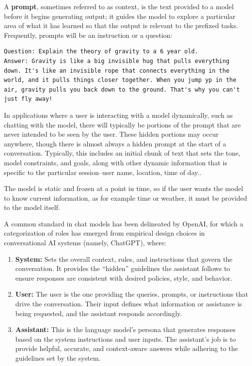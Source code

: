 A \textbf{prompt}, sometimes referred to as context, is the text provided to a model before it begins generating output; it guides the model to explore a particular area of what it has learned so that the output is relevant to the prefixed tasks. Frequently, prompts will be an instruction or a question:

\begin{Verbatim}[breaklines=true]
Question: Explain the theory of gravity to a 6 year old.
Answer: Gravity is like a big invisible hug that pulls everything down. It's like an invisible rope that connects everything in the world, and it pulls things closer together. When you jump yp in the air, gravity pulls you back down to the ground. That's why you can't just fly away!
\end{Verbatim}

In applications where a user is interacting with a model dynamically, such as chatting with the model, there will typically be portions of the prompt that are never intended to be seen by the user. These hidden portions may occur anywhere, though there is almost always a hidden prompt at the start of a conversation.
Typically, this includes an initial chunk of text that sets the tone, model constraints, and goals, along with other dynamic information that is specific to the particular session--user name, location, time of day..

The model is static and frozen at a point in time, so if the user wants the model to know current information, as for example time or weather, it must be provided to the model itself.

A common standard in chat models has been delineated by OpenAI, for which a categorization of roles has emerged from empirical design choices in conversational AI systems (namely, ChatGPT), where:

\begin{enumerate}
    \item \textbf{System:} Sets the overall context, rules, and instructions that govern the conversation. It provides the “hidden” guidelines the assistant follows to ensure responses are consistent with desired policies, style, and behavior.
    \item \textbf{User:} The user is the one providing the queries, prompts, or instructions that drive the conversation. Their input defines what information or assistance is being requested, and the assistant responds accordingly.
    \item \textbf{Assistant:} This is the language model’s persona that generates responses based on the system instructions and user inputs. The assistant’s job is to provide helpful, accurate, and context-aware answers while adhering to the guidelines set by the system.
\end{enumerate}

